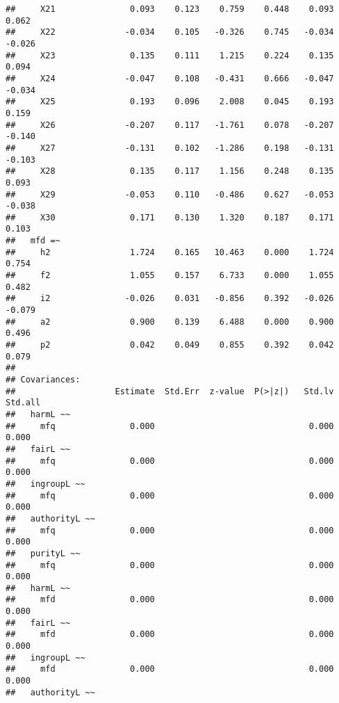 \documentclass[english,man]{apa6}
\newcounter{author}
\theoremstyle{definition}
\theoremstyle{definition}
\theoremstyle{definition}
\theoremstyle{remark}
\begin{document}
\begin{verbatim}
##     X21               0.093    0.123    0.759    0.448    0.093    0.062
##     X22              -0.034    0.105   -0.326    0.745   -0.034   -0.026
##     X23               0.135    0.111    1.215    0.224    0.135    0.094
##     X24              -0.047    0.108   -0.431    0.666   -0.047   -0.034
##     X25               0.193    0.096    2.008    0.045    0.193    0.159
##     X26              -0.207    0.117   -1.761    0.078   -0.207   -0.140
##     X27              -0.131    0.102   -1.286    0.198   -0.131   -0.103
##     X28               0.135    0.117    1.156    0.248    0.135    0.093
##     X29              -0.053    0.110   -0.486    0.627   -0.053   -0.038
##     X30               0.171    0.130    1.320    0.187    0.171    0.103
##   mfd =~                                                                
##     h2                1.724    0.165   10.463    0.000    1.724    0.754
##     f2                1.055    0.157    6.733    0.000    1.055    0.482
##     i2               -0.026    0.031   -0.856    0.392   -0.026   -0.079
##     a2                0.900    0.139    6.488    0.000    0.900    0.496
##     p2                0.042    0.049    0.855    0.392    0.042    0.079
## 
## Covariances:
##                    Estimate  Std.Err  z-value  P(>|z|)   Std.lv  Std.all
##   harmL ~~                                                              
##     mfq               0.000                               0.000    0.000
##   fairL ~~                                                              
##     mfq               0.000                               0.000    0.000
##   ingroupL ~~                                                           
##     mfq               0.000                               0.000    0.000
##   authorityL ~~                                                         
##     mfq               0.000                               0.000    0.000
##   purityL ~~                                                            
##     mfq               0.000                               0.000    0.000
##   harmL ~~                                                              
##     mfd               0.000                               0.000    0.000
##   fairL ~~                                                              
##     mfd               0.000                               0.000    0.000
##   ingroupL ~~                                                           
##     mfd               0.000                               0.000    0.000
##   authorityL ~~                                                         

\end{verbatim}
\end{document}
